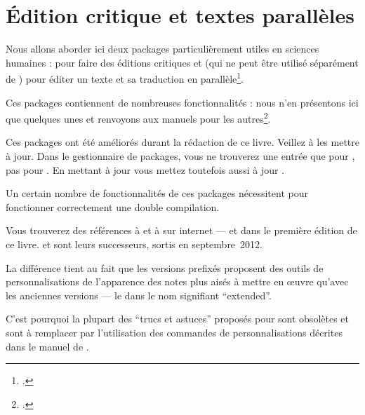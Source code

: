 \chapter{Édition critique et textes parallèles}  \label{eledmac}


\begin{intro}
Nous allons aborder ici deux packages particulièrement utiles en sciences humaines :  pour faire des éditions critiques et  (qui ne peut être utilisé séparément de ) pour éditer un texte et sa traduction en parallèle\footcite[Il existe un livre d'introduction aux éditions critiques avec \XeLaTeX :][]{leal2012}.

Ces packages contiennent de nombreuses fonctionnalités : nous n'en présentons ici que quelques unes et renvoyons aux manuels pour les autres\footcites{eledmac}{eledpar}. 
\end{intro}

\begin{attention}
Ces packages ont été améliorés durant la rédaction de ce livre. Veillez à les mettre à jour.
Dans le gestionnaire de packages, vous ne trouverez une entrée que pour  ,  pas pour .  En mettant à jour  vous mettez toutefois aussi à jour  .
\end{attention}

\begin{attention}
Un certain nombre de fonctionnalités de ces packages nécessitent pour fonctionner correctement une double compilation.
\end{attention}

\begin{plusloins}
Vous trouverez des références à  et à  sur internet --- et dans le première édition de ce livre.
 et  sont leurs successeurs, sortis en septembre~2012.

La différence tient au fait que les versions prefixés proposent des outils de personnalisations de l'apparence des notes plus aisés à mettre en œuvre qu'avec les anciennes versions --- le  dans le nom signifiant \enquote{\textenglish{extended}}. 

C'est pourquoi la plupart des \enquote{trucs et astuces} proposés pour  sont obsolètes et sont à remplacer par l'utilisation des commandes de personnalisations décrites dans le manuel de .
\end{plusloins}

